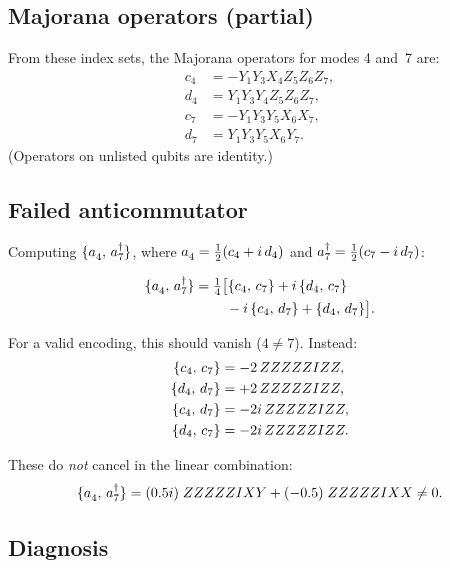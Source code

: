 \subsection*{Majorana operators (partial)}

From these index sets, the Majorana operators for modes 4 and~7 are:
\begin{align*}
  c_4 &= -Y_1 Y_3 X_4 Z_5 Z_6 Z_7, \\
  d_4 &= Y_1 Y_3 Y_4 Z_5 Z_6 Z_7, \\
  c_7 &= -Y_1 Y_3 Y_5 X_6 X_7, \\
  d_7 &= Y_1 Y_3 Y_5 X_6 Y_7.
\end{align*}
(Operators on unlisted qubits are identity.)

\subsection*{Failed anticommutator}

Computing $\acomm{\an{4}}{\ad{7}}$, where
$\an{4} = \frac{1}{2}(c_4 + i\,d_4)$ and
$a_{7}^{\dagger} = \frac{1}{2}(c_7 - i\,d_7)$:

\begin{align*}
  \acomm{\an{4}}{\ad{7}}
    &= \tfrac{1}{4}\bigl[
      \acomm{c_4}{c_7} + i\,\acomm{d_4}{c_7} \\
    &\quad\quad\;  - i\,\acomm{c_4}{d_7} + \acomm{d_4}{d_7}
    \bigr].
\end{align*}

For a valid encoding, this should vanish ($4 \neq 7$).  Instead:
\begin{align*}
  \{c_4,\,c_7\} &= -2\,ZZZZZIZZ, \\
  \{d_4,\,d_7\} &= +2\,ZZZZZIZZ, \\
  \{c_4,\,d_7\} &= -2i\,ZZZZZIZZ, \\
  \{d_4,\,c_7\} &= -2i\,ZZZZZIZZ.
\end{align*}

These do \emph{not} cancel in the linear combination:
\begin{equation*}
  \acomm{\an{4}}{\ad{7}} = (0.5i)\; ZZZZZIXY + (-0.5)\; ZZZZZIXX
    \neq 0.
\end{equation*}

\subsection*{Diagnosis}


